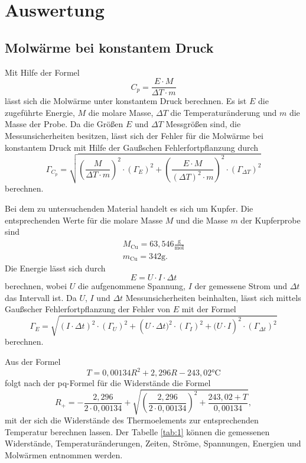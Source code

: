 \section{Auswertung}
\subsection{Molwärme bei konstantem Druck}
Mit Hilfe der Formel
\begin{equation}
  C_p = \frac{E \cdot M}{\Delta T \cdot m}
\end{equation}
lässt sich die Molwärme unter konstantem Druck berechnen.
Es ist $E$ die zugeführte Energie, $M$ die molare Masse, $\Delta T$ die Temperaturänderung und $m$ die Masse der Probe.
Da die Größen $E$ und $\Delta{T}$ Messgrößen sind, die Messunsicherheiten besitzen,
lässt sich der Fehler für die Molwärme bei konstantem Druck mit Hilfe der Gaußschen Fehlerfortpflanzung durch
\begin{equation}
  \Gamma_{C_p} = \sqrt{ \left(\frac{M}{\Delta{T}\cdot m }\right)^2 \cdot (\Gamma_E)^2 + \left(\frac{E\cdot{M}}{(\Delta{T})^2\cdot{m}}\right)^2\cdot(\Gamma_{\Delta{T}})^2 }
\end{equation}
berechnen.

Bei dem zu untersuchenden Material handelt es sich um Kupfer.
Die entsprechenden Werte für die molare Masse $M$ \cite{cu} und die Masse $m$ der Kupferprobe \cite{skript} sind
\begin{gather*}
  M_{\text{Cu}} = 63,546\frac{\text{g}}{\text{mol}} \\
  m_{\text{Cu}} = 342\si{\gram}.
\end{gather*}
Die Energie lässt sich durch
\begin{equation}
  E = U\cdot I\cdot \Delta t
\end{equation}
berechnen, wobei $U$ die aufgenommene Spannung, $I$ der gemessene Strom und $\Delta t$ das Intervall ist.
Da $U$, $I$ und $\Delta{t}$ Messunsicherheiten beinhalten,
lässt sich mittels Gaußscher Fehlerfortpflanzung der Fehler von $E$ mit der Formel
\begin{equation}
  \Gamma_E = \sqrt{ \left(I\cdot\Delta{t}\right)^2\cdot(\Gamma_U)^2 + \left(U\cdot\Delta{t})^2\cdot(\Gamma_I)^2 + (U\cdot{I}\right)^2\cdot(\Gamma_{\Delta{t}})^2 }
\end{equation}
berechnen.

Aus der Formel
\begin{equation}
  T = 0,00134R^2 + 2,296R - 243,02\text{°C}
\end{equation}
folgt nach der pq-Formel für die Widerstände die Formel
\begin{equation}
  R_+ = -\frac{2,296}{2\cdot0,00134} + \sqrt{ \left(\frac{2,296}{2\cdot0,00134}\right)^2 + \frac{243,02 + T}{0,00134} },
  \end{equation}
mit der sich die Widerstände des Thermoelements zur entsprechenden Temperatur berechnen lassen.
Der Tabelle \ref{tab:1} können die gemessenen Widerstände, Temperaturänderungen, Zeiten, Ströme, Spannungen, Energien und Molwärmen entnommen werden.

